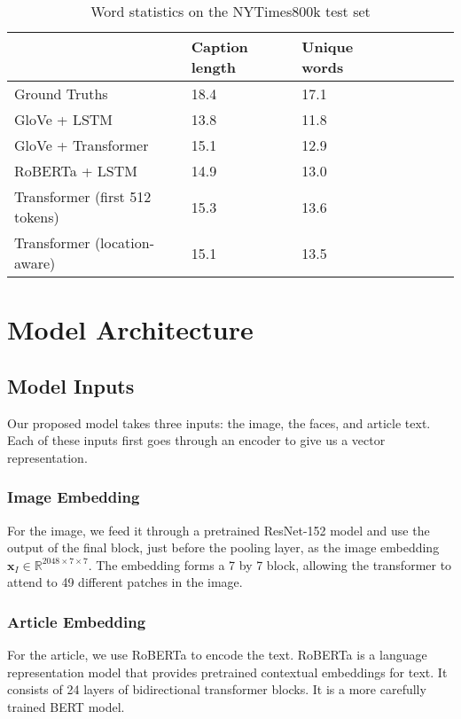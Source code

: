 \documentclass[10pt,twocolumn,letterpaper]{article}
\begin{document}
\begin{table*}[t]
	\caption {Word statistics on the NYTimes800k test set}
	\label{tab:results-stats}
	\centering
	\begin{tabular}{lllllll}
		\toprule
        & Caption length  & Unique words \\
      \midrule
      Ground Truths & 18.4 & 17.1 \\
      GloVe + LSTM  & 13.8 & 11.8 \\
      GloVe + Transformer  & 15.1 & 12.9 \\
      RoBERTa + LSTM  & 14.9 & 13.0 \\
      Transformer (first 512 tokens)  & 15.3 & 13.6 \\
      Transformer (location-aware) & 15.1 & 13.5  \\
		\bottomrule
	\end{tabular}
\end{table*}





\section{Model Architecture}

\subsection{Model Inputs}

Our proposed model takes three inputs: the image, the faces, and article text.
Each of these inputs first goes through an encoder to give us a vector
representation.

\subsubsection{Image Embedding}

For the image, we feed it through a pretrained ResNet-152 model
\cite{He2016ResNet} and use the output of the final block, just before the
pooling layer, as the image embedding $\bm{x}_I \in \mathbb{R}^{2048 \times 7
\times 7}$. The embedding forms a 7 by 7 block, allowing the transformer to
attend to 49 different patches in the image.

\subsubsection{Article Embedding}

For the article, we use RoBERTa \cite{Liu2019RoBERTaAR} to encode the text.
RoBERTa is a language representation model that provides pretrained contextual
embeddings for text. It consists of 24 layers of bidirectional transformer
blocks. It is a more carefully trained BERT \cite{Devlin2019BERT} model.
\end{document}
